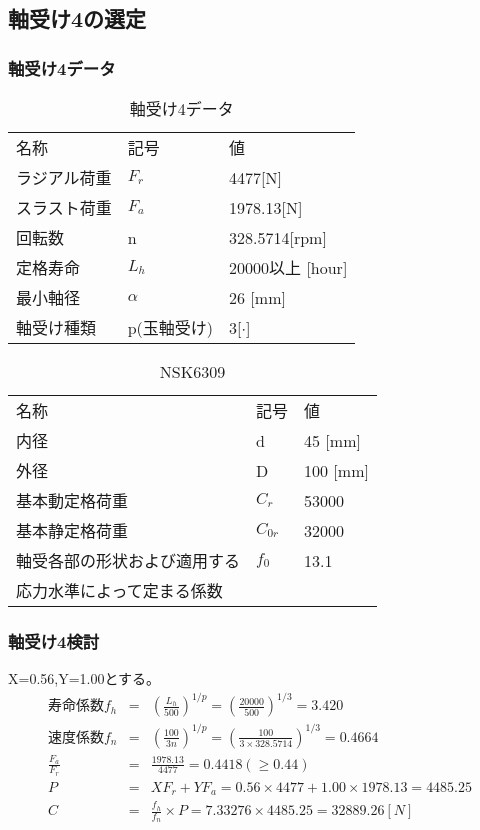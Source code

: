 \newpage
\subsection{軸受け4の選定}
\subsubsection{軸受け4データ}
\begin{table}[htb]
\begin{center}
  \caption{軸受け4データ}
  \begin{tabular}{lll} \hline
名称&記号&値\\
ラジアル荷重&$F_r$&4477[N]\\
スラスト荷重&$F_a$&1978.13[N]\\
回転数&n&328.5714[rpm]\\
定格寿命&$L_h$&20000以上 [hour]\\
最小軸径&$\alpha$&26 [mm]\\
軸受け種類&p(玉軸受け)&3[$\cdot$]\\
\hline
  \end{tabular}
\end{center}
\end{table}

\begin{table}[htb]
\begin{center}
  \caption{NSK6309}
  \begin{tabular}{lll} \hline
名称&記号&値\\
内径& d &45 [mm]\\
外径& D &100 [mm]\\
基本動定格荷重&$C_{r}$&53000\\
基本静定格荷重&$C_{0r}$&32000\\
軸受各部の形状および適用する&$f_0$&13.1\\
応力水準によって定まる係数&&\\
\hline
  \end{tabular}
\end{center}
\end{table}

\subsubsection{軸受け4検討}
X=0.56,Y=1.00とする。
\begin{eqnarray}
寿命係数f_h &=& \left( \frac{L_h}{500} \right)^{1/p} = \left( \frac{20000}{500} \right)^{1/3} = 3.420\\
速度係数f_n &=& \left( \frac{100}{3n} \right)^{1/p} = \left( \frac{100}{3 \times 328.5714} \right)^{1/3} = 0.4664\\
\frac{F_a}{F_r} &=& \frac{1978.13}{4477} = 0.4418(\geq 0.44)\\
P &=& XF_r+YF_a = 0.56 \times 4477 + 1.00 \times 1978.13 = 4485.25\\
C &=& \frac{f_h}{f_n} \times P = 7.33276 \times 4485.25 = 32889.26[N]
\end{eqnarray}


